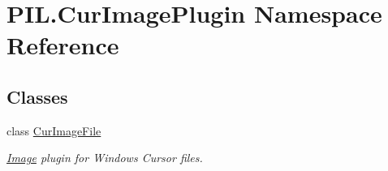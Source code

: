 \hypertarget{namespacePIL_1_1CurImagePlugin}{}\section{P\+I\+L.\+Cur\+Image\+Plugin Namespace Reference}
\label{namespacePIL_1_1CurImagePlugin}
\subsection*{Classes}
\begin{DoxyCompactItemize}
\item 
class \hyperlink{classPIL_1_1CurImagePlugin_1_1CurImageFile}{Cur\+Image\+File}
\begin{DoxyCompactList}\small\item\em \hyperlink{namespacePIL_1_1Image}{Image} plugin for Windows Cursor files. \end{DoxyCompactList}\end{DoxyCompactItemize}
